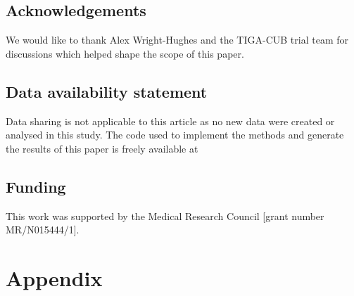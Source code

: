 \documentclass{article}
\begin{document}
\subsection*{Acknowledgements}

We would like to thank Alex Wright-Hughes and the TIGA-CUB trial team for discussions which helped shape the scope of this paper.

\subsection*{Data availability statement}

Data sharing is not applicable to this article as no new data were created or analysed in this study. The code used to implement the methods and generate the results of this paper is freely available at %

\subsection*{Funding}

This work was supported by the Medical Research Council [grant number MR/N015444/1].




\section*{Appendix}
\end{document}
